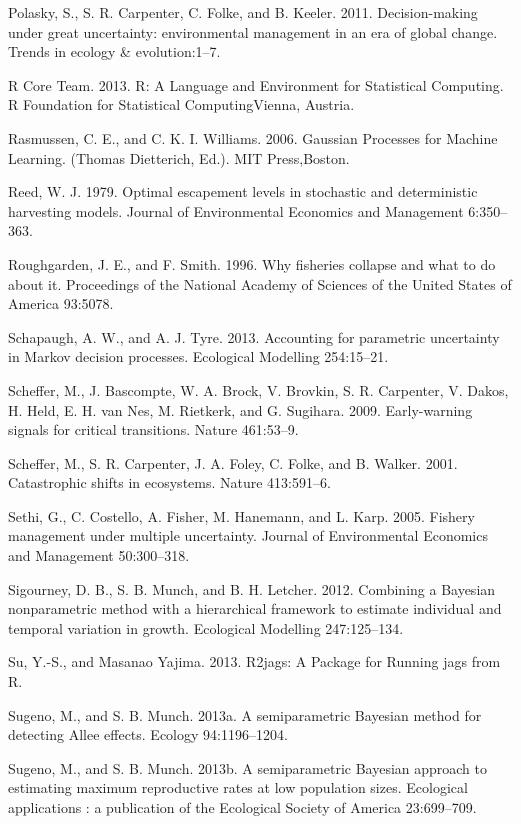 \documentclass[author-year, 12pt,review]{components/elsarticle} %
\begin{document}
Polasky, S., S. R. Carpenter, C. Folke, and B. Keeler. 2011.
Decision-making under great uncertainty: environmental management in an
era of global change. Trends in ecology \& evolution:1--7.

R Core Team. 2013. R: A Language and Environment for Statistical
Computing. R Foundation for Statistical ComputingVienna, Austria.

Rasmussen, C. E., and C. K. I. Williams. 2006. Gaussian Processes for
Machine Learning. (Thomas Dietterich, Ed.). MIT Press,Boston.

Reed, W. J. 1979. Optimal escapement levels in stochastic and
deterministic harvesting models. Journal of Environmental Economics and
Management 6:350--363.

Roughgarden, J. E., and F. Smith. 1996. Why fisheries collapse and what
to do about it. Proceedings of the National Academy of Sciences of the
United States of America 93:5078.

Schapaugh, A. W., and A. J. Tyre. 2013. Accounting for parametric
uncertainty in Markov decision processes. Ecological Modelling
254:15--21.

Scheffer, M., J. Bascompte, W. A. Brock, V. Brovkin, S. R. Carpenter, V.
Dakos, H. Held, E. H. van Nes, M. Rietkerk, and G. Sugihara. 2009.
Early-warning signals for critical transitions. Nature 461:53--9.

Scheffer, M., S. R. Carpenter, J. A. Foley, C. Folke, and B. Walker.
2001. Catastrophic shifts in ecosystems. Nature 413:591--6.

Sethi, G., C. Costello, A. Fisher, M. Hanemann, and L. Karp. 2005.
Fishery management under multiple uncertainty. Journal of Environmental
Economics and Management 50:300--318.

Sigourney, D. B., S. B. Munch, and B. H. Letcher. 2012. Combining a
Bayesian nonparametric method with a hierarchical framework to estimate
individual and temporal variation in growth. Ecological Modelling
247:125--134.

Su, Y.-S., and Masanao Yajima. 2013. R2jags: A Package for Running jags
from R.

Sugeno, M., and S. B. Munch. 2013a. A semiparametric Bayesian method for
detecting Allee effects. Ecology 94:1196--1204.

Sugeno, M., and S. B. Munch. 2013b. A semiparametric Bayesian approach
to estimating maximum reproductive rates at low population sizes.
Ecological applications : a publication of the Ecological Society of
America 23:699--709.
\end{document}
